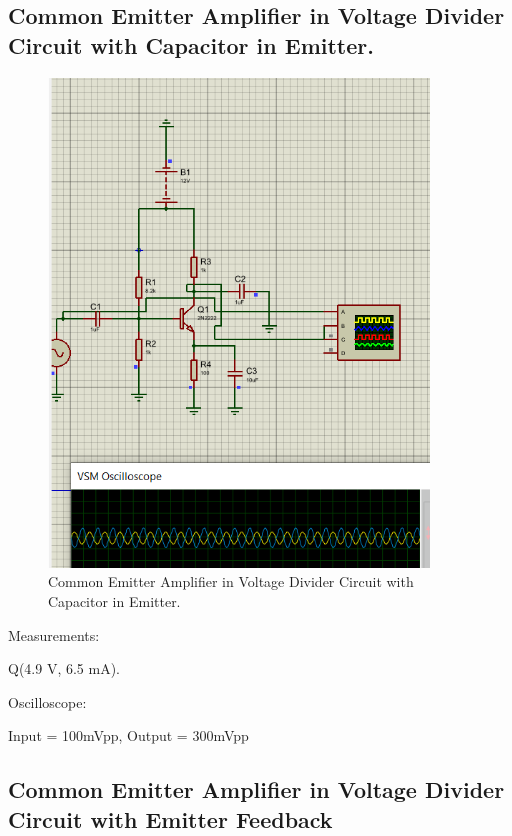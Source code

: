 \subsection{Common Emitter Amplifier in Voltage Divider Circuit with Capacitor in Emitter.}

\begin{figure}[H]
    \centering
    \includegraphics[width = 0.9\textwidth]{Imagenes/Imagenes_Santiago/5.PNG}
    \caption{Common Emitter Amplifier in Voltage Divider Circuit with Capacitor in Emitter.}
    \label{circuit1Simulated}
\end{figure}

Measurements:
\begin{center}
    Q(4.9 V, 6.5 mA).
    
\end{center}
Oscilloscope:

\begin{center}
    Input = 100mVpp, Output = 300mVpp
\end{center}

\newpage

\subsection{Common Emitter Amplifier in Voltage Divider Circuit with Emitter Feedback}

